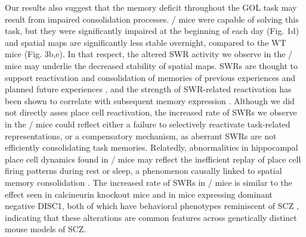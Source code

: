Our results also suggest that the memory deficit throughout the GOL task may result from impaired consolidation processes. \df/ mice were capable of solving this task, but they were significantly impaired at the beginning of each day (Fig. 1d) and spatial maps are significantly less stable overnight, compared to the WT mice (Fig. 3b,e). In that respect, the altered SWR activity we observe in the \df/ mice may underlie the decreased stability of spatial maps.  SWRs are thought to support reactivation and consolidation of memories of previous experiences and planned future experiences \citep{Buzsaki2015}\citep{Diba2007}\citep{Foster2006}\citep{Jadhav2012}\citep{Kudrimoti1999}, and the strength of SWR-related reactivation has been shown to correlate with subsequent memory expression \citep{Dupret2010a}. Although we did not directly asses place cell reactivation, the increased rate of SWRs we observe in the \df/ mice could reflect either a failure to selectively reactivate task-related representations, or a compensatory mechanism, as aberrant SWRs are not efficiently consolidating task memories. Relatedly, abnormalities in hippocampal place cell dynamics found in \df/ mice may reflect the inefficient replay of place cell firing patterns during rest or sleep, a phenomenon causally linked to spatial memory consolidation \citep{DeLavilleon2015}. The increased rate of SWRs in \df/ mice is similar to the effect seen in calcineurin knockout mice and in mice expressing dominant negative DISC1, both of which have behavioral phenotypes reminiscent of SCZ \citep{Altimus2015}\citep{Suh2013}, indicating that these alterations are common features across genetically distinct mouse models of SCZ.

